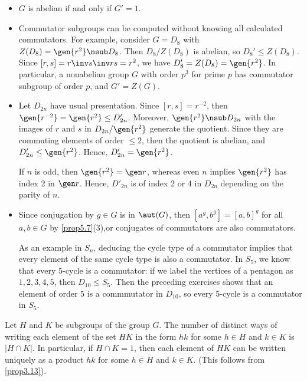 \begin{ex}
    \begin{itemize}
        \item $G$ is abelian if and only if $G' = 1$.
        \item Commutator subgroups can be computed without knowing all calculated commutators. For example, consider $G = D_8$ with $Z(D_8) = \gen{r^2} \nsub D_8$. Then $D_8/Z(D_8)$ is abelian, so $D_8' \leq Z(D_8)$. Since $[r, s] = r\inv s\inv rs = r^2$, we have $D_8' = Z(D_8) = \gen{r^2}$. In particular, a nonabelian group $G$ with order $p^3$ for prime $p$ has commutator subgroup of order $p$, and $G' = Z(G)$.
        \item Let $D_{2n}$ have usual presentation. Since $[r, s] = r^{-2}$, then $\gen{r^{-2}} = \gen{r^2} \leq D'_{2n}$. Moreover, $\gen{r^2} \nsub D_{2n}$ with the images of $r$ and $s$ in $D_{2n}/\gen{r^2}$ generate the quotient. Since they are commuting elements of order $\leq 2$, then the quotient is abelian, and $D'_{2n} \leq \gen{r^2}$. Hence, $D'_{2n} = \gen{r^2}$.
        
        If $n$ is odd, then $\gen{r^2} = \gen r$, whereas even $n$ implies $\gen{r^2}$ has index 2 in $\gen r$. Hence, $D'_{2n}$ is of index 2 or 4 in $D_{2n}$ depending on the parity of $n$.
        \item Since conjugation by $g \in G$ is in $\aut(G)$, then $[a^g, b^g] = [a, b]^g$ for all $a, b \in G$ by \autoref{prop5.7}(3),or conjugates of commutators are also commutators.
        
        As an example in $S_n$, deducing the cycle type of a commutator implies that every element of the same cycle type is also a commutator. In $S_5$, we know that every 5-cycle is a commutator: if we label the vertices of a pentagon as $1, 2, 3, 4, 5$, then $D_{10} \leq S_5$. Then the preceding exercises shows that an element of order 5 is a commmutator in $D_{10}$, so every 5-cycle is a commutator in $S_5$.
    \end{itemize}
\end{ex}

\begin{prop}
    \label{prop5.8}
    Let $H$ and $K$ be subgroups of the group $G$. The number of distinct ways of writing each element of the set $HK$ in the form $hk$ for some $h \in H$ and $k \in K$ is $|H \cap K|$. In particular, if $H \cap K = 1$, then each element of $HK$ can be written uniquely as a product $hk$ for some $h \in H$ and $k \in K$. (This follows from \autoref{prop3.13}).
\end{prop}


